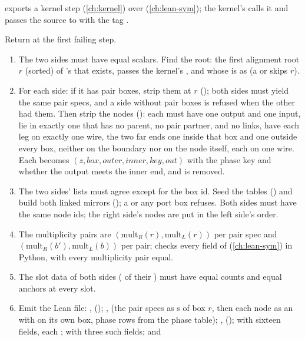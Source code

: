 {{{ exports a kernel  step (\cref{ch:kernel}) over  (\cref{ch:lean-sym}); the kernel's  calls it and passes the source to  with the tag .

\begin{algorithm}\label{alg:lean-export-merge}
Return  at the first failing step.
\begin{enumerate}
\item The two sides must have equal scalars. Find the root: the first alignment root $r$ (sorted) of 's \bboxes{} that exists, passes the kernel's , and whose  is  as  (a  or  skips $r$).
\item For each side: if it has pair boxes, strip them at $r$ (); both sides must yield the same pair specs, and a side without pair boxes is refused when the other had them. Then strip the  nodes (): each must have one output and one input, lie in exactly one \bbox{} that has no parent, no pair partner, and no links, have each leg on exactly one wire, the two far ends one inside that box and one outside every box, neither on the boundary nor on the node itself, each on one wire. Each becomes $(z,\mathit{box},\mathit{outer},\mathit{inner},\mathit{key},\mathit{out})$ with the phase key and whether the output meets the inner end, and is removed.
\item The two sides'  lists must agree except for the box id. Seed the tables () and build both linked mirrors (); a  or any port box refuses. Both sides must have the same node ids; the right side's nodes are put in the left side's order.
\item The multiplicity pairs are $(\mathrm{mult}_R(r),\mathrm{mult}_L(r))$ per pair spec and $(\mathrm{mult}_R(b'),\mathrm{mult}_L(b))$ per  pair;  checks every field of  (\cref{ch:lean-sym}) in Python, with every multiplicity pair equal.
\item The slot data of both sides ( of their ) must have equal counts and equal anchors at every slot.
\item Emit the Lean file: ,  (); ,  (the pair specs as s of box $r$, then each  node as an  with  on its own box, phase rows from the phase table); ,  ();  with sixteen fields, each ;  with three such fields; and

\end{enumerate}
\end{algorithm}}}}
